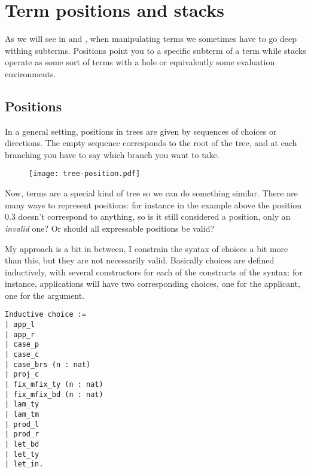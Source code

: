 \chapter{Term positions and stacks}

As we will see in  and , when
manipulating terms we sometimes have to go deep withing subterms.
Positions point you to a specific subterm of a term while stacks operate as
some sort of terms with a hole or equivalently some evaluation environments.

\section{Positions}

In a general setting, positions in trees are given by sequences of choices or
directions. The empty sequence corresponds to the root of the tree, and at each
branching you have to say which branch you want to take.

\begin{figure}[hb]
  \texttt{[image: tree-position.pdf]}
\end{figure}

Now, terms are a special kind of tree so we can do something similar.
There are many ways to represent positions: for instance in the example above
the position \(0.3\) doesn't correspond to anything, so is it still considered
a position, only an \emph{invalid} one? Or should all expressable positions
be valid?

My approach is a bit in between, I constrain the syntax of choices a bit more
than this, but they are not necessarily valid.
Basically choices are defined inductively, with several constructors for each
of the constructs of the syntax: for instance, applications will have two
corresponding choices, one for the applicant, one for the argument.
\begin{verbatim}
Inductive choice :=
| app_l
| app_r
| case_p
| case_c
| case_brs (n : nat)
| proj_c
| fix_mfix_ty (n : nat)
| fix_mfix_bd (n : nat)
| lam_ty
| lam_tm
| prod_l
| prod_r
| let_bd
| let_ty
| let_in.
\end{verbatim}

